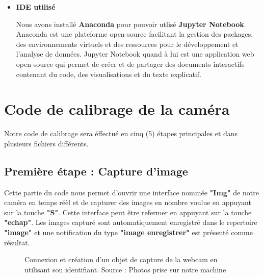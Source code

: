 \begin{itemize}[label={\Huge$\star$}]
 \item \textbf{IDE utilisé}	
  			
  			Nous avons installé \textbf{Anaconda}  pour pouvoir utlisé \textbf{Jupyter Notebook}. Anaconda est une plateforme open-source facilitant la gestion des packages, des environnements virtuels et des ressources pour le développement et l'analyse de données.
  			Jupyter Notebook quand à lui est une application web open-source qui permet de créer et de partager des documents interactifs contenant du code, des visualisations et du texte explicatif.
\end{itemize}
 
 
 \newpage
\section{Code de calibrage de la caméra}
 Notre code de calibrage sera éffectué en cinq (5) étapes principales et dans plusieurs fichiers différents.
 
  \subsection{Première étape : Capture d'image}
 		
 	Cette partie du code nous permet d'ouvrir une interface nommée \textbf{"Img"} de notre caméra en temps réèl et de capturer des images en nombre voulue en appuyant sur la touche \textbf{"S"}. Cette interface peut être refermer en appuyant sur la touche \textbf{"echap"}. Les images capturé sont automatiquement enregistré dans le repertoire \textbf{"image"} et une notification du type \textbf{"image enregistrer"} est présenté comme résultat.
 	
 	\begin{figure}[H]%
 		\center%
 		\setlength{\fboxsep}{5pt}%
 		\setlength{\fboxrule}{0.5pt}%
 		\caption[Code de capture d'image (partie 1)]{Connexion et création d'un objet de capture de la webcam en utilisant son identifiant. Source : Photos prise sur notre machine}%
 		\label{fig:Code de capture d'image(partie 1)}
 	\end{figure}
 	
